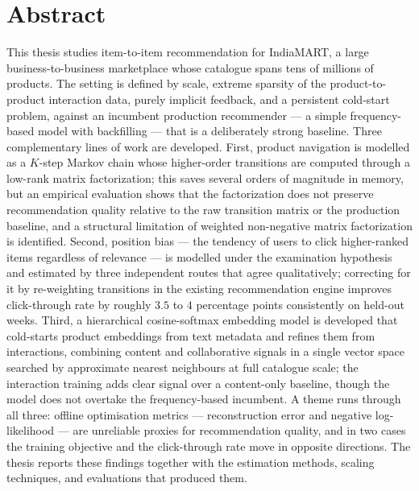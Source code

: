 \chapter*{Abstract}

This thesis studies item-to-item recommendation for IndiaMART, a large
business-to-business marketplace whose catalogue spans tens of millions of
products. The setting is defined by scale, extreme sparsity of the
product-to-product interaction data, purely implicit feedback, and a persistent
cold-start problem, against an incumbent production recommender --- a simple
frequency-based model with backfilling --- that is a deliberately strong
baseline. Three complementary lines of work are developed. First, product
navigation is modelled as a $K$-step Markov chain whose higher-order transitions
are computed through a low-rank matrix factorization; this saves several orders
of magnitude in memory, but an empirical evaluation shows that the factorization
does not preserve recommendation quality relative to the raw transition matrix or
the production baseline, and a structural limitation of weighted non-negative
matrix factorization is identified. Second, position bias --- the tendency of
users to click higher-ranked items regardless of relevance --- is modelled under
the examination hypothesis and estimated by three independent routes that agree
qualitatively; correcting for it by re-weighting transitions in the existing
recommendation engine improves click-through rate by roughly $3.5$ to $4$
percentage points consistently on held-out weeks. Third, a hierarchical
cosine-softmax embedding model is developed that cold-starts product embeddings
from text metadata and refines them from interactions, combining content and
collaborative signals in a single vector space searched by approximate nearest
neighbours at full catalogue scale; the interaction training adds clear signal
over a content-only baseline, though the model does not overtake the
frequency-based incumbent. A theme runs through all three: offline optimisation
metrics --- reconstruction error and negative log-likelihood --- are unreliable
proxies for recommendation quality, and in two cases the training objective and
the click-through rate move in opposite directions. The thesis reports these
findings together with the estimation methods, scaling techniques, and
evaluations that produced them.
